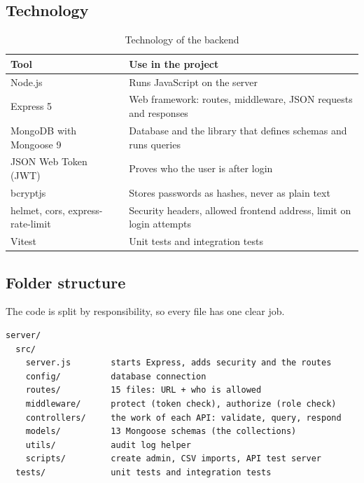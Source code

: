 \documentclass[11pt,a4paper]{article}
\begin{document}
\subsection{Technology}
\begin{table}[h]
\centering
\begin{tabularx}{\textwidth}{@{}P{3.6cm}Y@{}}
\toprule
\textbf{Tool} & \textbf{Use in the project} \\
\midrule
Node.js & Runs JavaScript on the server \\
Express 5 & Web framework: routes, middleware, JSON requests and responses \\
MongoDB with Mongoose 9 & Database and the library that defines schemas and runs queries \\
JSON Web Token (JWT) & Proves who the user is after login \\
bcryptjs & Stores passwords as hashes, never as plain text \\
helmet, cors, express-rate-limit & Security headers, allowed frontend address, limit on login attempts \\
Vitest & Unit tests and integration tests \\
\bottomrule
\end{tabularx}
\caption{Technology of the backend}
\end{table}

\subsection{Folder structure}
The code is split by responsibility, so every file has one clear job.
\begin{lstlisting}[style=query]
server/
  src/
    server.js        starts Express, adds security and the routes
    config/          database connection
    routes/          15 files: URL + who is allowed
    middleware/      protect (token check), authorize (role check)
    controllers/     the work of each API: validate, query, respond
    models/          13 Mongoose schemas (the collections)
    utils/           audit log helper
    scripts/         create admin, CSV imports, API test server
  tests/             unit tests and integration tests
\end{lstlisting}
\end{document}

